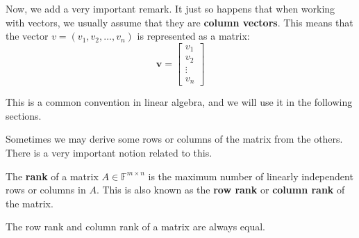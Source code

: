 \documentclass[../lecture-notes-148x210.tex]{subfiles}
\begin{document}
\vspace{-4mm}

\begin{remark}
    Now, we add a very important remark. It just so happens that when working with vectors, we usually assume that they are \textbf{column vectors}. This means that the vector $v = (v_1,v_2,\dots,v_n)$ is represented as a matrix:
    \begin{equation*}
        \mathbf{v} = \begin{bmatrix} v_1 \\ v_2 \\ \vdots \\ v_n \end{bmatrix}
    \end{equation*} 

    This is a common convention in linear algebra, and we will use it in the following sections.
\end{remark}

Sometimes we may derive some rows or columns of the matrix from the others. There is a very important notion related to this.

\begin{definition}
    The \textbf{rank} of a matrix $A \in \mathbb{F}^{m \times n}$ is the maximum number of linearly independent rows or columns in $A$. This is also known as the \textbf{row rank} or \textbf{column rank} of the matrix.
\end{definition}

\vspace{-4mm}

\begin{remark}
    The row rank and column rank of a matrix are always equal.
\end{remark}

\vspace{-4mm}
\end{document}
